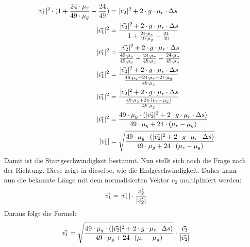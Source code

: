 \begin{align}
    \lvert \vec{v_1} \rvert^2 \cdot (1 + \frac{24 \cdot \mu_r}{49 \cdot \mu_g} - \frac{24}{49}) &= \lvert \vec{v_2} \rvert^2 + 2 \cdot g \cdot \mu_r \cdot \Delta s\\
    \lvert \vec{v_1} \rvert^2 &= \frac{\lvert \vec{v_2} \rvert^2 + 2 \cdot g \cdot \mu_r \cdot \Delta s}{1 + \frac{24 \cdot \mu_r}{49 \cdot \mu_g} - \frac{24}{49}}\\
    \lvert \vec{v_1} \rvert^2 &= \frac{\lvert \vec{v_2} \rvert^2 + 2 \cdot g \cdot \mu_r \cdot \Delta s}{\frac{49 \cdot \mu_g}{49 \cdot \mu_g} + \frac{24 \cdot \mu_r}{49 \cdot \mu_g} - \frac{24 \cdot \mu_g}{49 \cdot \mu_g}}\\
    \lvert \vec{v_1} \rvert^2 &= \frac{\lvert \vec{v_2} \rvert^2 + 2 \cdot g \cdot \mu_r \cdot \Delta s}{\frac{49 \cdot \mu_g + 24 \cdot \mu_r - 24 \cdot \mu_g}{49 \cdot \mu_g}}\\
    \lvert \vec{v_1} \rvert^2 &= \frac{\lvert \vec{v_2} \rvert^2 + 2 \cdot g \cdot \mu_r \cdot \Delta s}{\frac{49 \cdot \mu_g + 24 \cdot (\mu_r - \mu_g)}{49 \cdot \mu_g}}\\
    \lvert \vec{v_1} \rvert^2 &= \frac{49 \cdot \mu_g \cdot (\lvert \vec{v_2} \rvert^2 + 2 \cdot g \cdot \mu_r \cdot \Delta s)}{49 \cdot \mu_g + 24 \cdot (\mu_r - \mu_g)}\\
    \lvert \vec{v_1} \rvert &= \sqrt{\frac{49 \cdot \mu_g \cdot (\lvert \vec{v_2} \rvert^2 + 2 \cdot g \cdot \mu_r \cdot \Delta s)}{49 \cdot \mu_g + 24 \cdot (\mu_r - \mu_g)}}
\end{align}
Damit ist die Startgeschwindigkeit bestimmt. Nun stellt sich noch die Frage nach der Richtung. Diese zeigt in dieselbe,
wie die Endgeschwindigkeit. Daher kann nun die bekannte Länge mit dem normalisierten Vektor $v_2$ multipliziert
werden:
\begin{align}
    \vec{v_1} = \lvert \vec{v_1} \rvert \cdot \frac{\vec{v_2}}{\lvert \vec{v_2} \rvert}
\end{align}
Daraus folgt die Formel:
\begin{align}
    \vec{v_1} = \sqrt{\frac{49 \cdot \mu_g \cdot (\lvert \vec{v_2} \rvert^2 + 2 \cdot g \cdot \mu_r \cdot \Delta s)}{49 \cdot \mu_g + 24 \cdot (\mu_r - \mu_g)}} \cdot \frac{\vec{v_2}}{\lvert \vec{v_2} \rvert}
\end{align}
